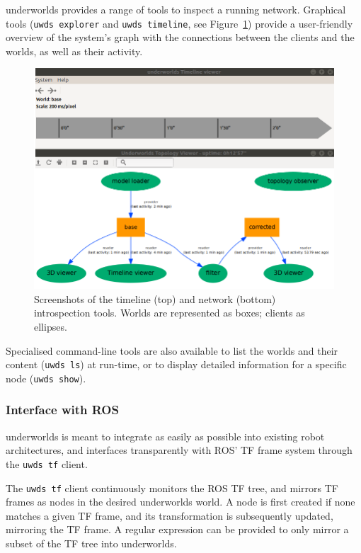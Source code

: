 \documentclass[conference]{IEEEtran}
\newcommand{\uwds}{{\sc underworlds}\xspace}
\begin{document}
\uwds provides a range of tools to inspect a running network. Graphical
tools ({\tt uwds explorer} and {\tt uwds timeline}, see Figure~\ref{fig|explorer})
provide a user-friendly overview of the system's graph with the connections
between the clients and the worlds, as well as their activity.

\begin{figure}
    \centering
    \includegraphics[width=\linewidth]{tools}
    \caption{Screenshots of the timeline (top) and network (bottom)
    introspection tools. Worlds are represented as boxes; clients as ellipses.}
    \label{fig|explorer}
\end{figure}

Specialised command-line tools are also available to list the worlds
and their content ({\tt uwds ls}) at run-time, or to display detailed information for a
specific node ({\tt uwds show}).

\subsubsection{Interface with ROS}

\uwds is meant to integrate as easily as possible into existing robot
architectures, and interfaces transparently with ROS' TF frame system through
the {\tt uwds tf} client.

The {\tt uwds tf} client continuously monitors the ROS TF tree, and mirrors
TF frames as nodes in the desired \uwds world. A node is first created if none
matches a given TF frame, and its transformation is subsequently updated,
mirroring the TF frame. A regular expression can be provided to only mirror a
subset of the TF tree into \uwds.
\end{document}
